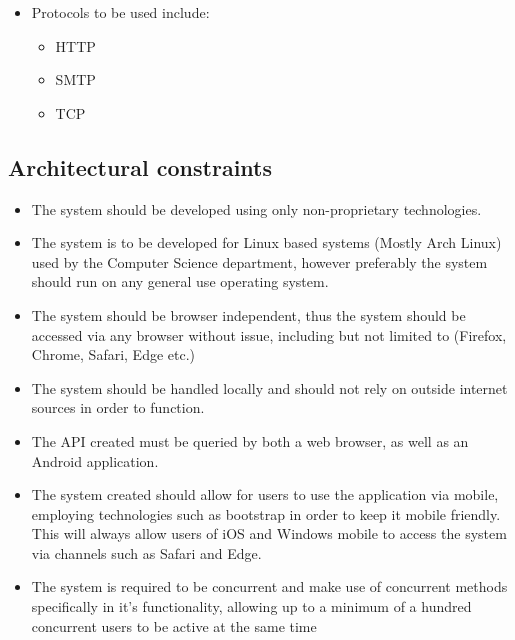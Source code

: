 \documentclass{article}
\begin{document}
			
			\begin{itemize}
				\item Protocols to be used include:
					\begin{itemize}
						\item HTTP
						\item SMTP
						\item TCP
					\end{itemize}
			\end{itemize}

			\cleardoublepage
			
	\subsection{Architectural constraints}\label{subsec:constraints}
		\begin{itemize}
			\item The system should be developed using only non-proprietary technologies.
			\item The system is to be developed for Linux based systems (Mostly Arch Linux) used by the Computer Science department, however preferably the system should run on any general use operating system.
			\item The system should be browser independent, thus the system should be accessed via any browser without issue, including but not limited to (Firefox, Chrome, Safari, Edge etc.)
			\item The system should be handled locally and should not rely on outside internet sources in order to function.
			\item The API created must be queried by both a web browser, as well as an Android application.
			\item The system created should allow for users to use the application via mobile, employing technologies such as bootstrap in order to keep it mobile friendly. This will always allow users of iOS and Windows mobile to access the system via channels such as Safari and Edge.
			\item The system is required to be concurrent and make use of concurrent methods specifically in it's functionality, allowing up to a minimum of a hundred concurrent users to be active at the same time
		\end{itemize}

	
\end{document}
